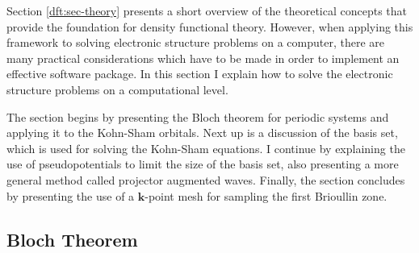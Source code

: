 \begin{refsection}
Section \ref{dft:sec-theory} presents a short overview of the theoretical 
concepts that provide the foundation for density functional theory. However, 
when applying this framework to solving electronic structure problems on a 
computer, there are many practical considerations which have to be made in 
order to implement an effective software package. In this section I explain 
how to solve the electronic structure problems on a computational 
level.  
 
The section begins by presenting the Bloch theorem for periodic systems and applying it 
to the Kohn-Sham orbitals. Next up is a discussion of the  
basis set, which is used for solving the Kohn-Sham equations.  I continue by 
explaining the use of pseudopotentials to limit the size of the basis set, 
also presenting a more general method called projector augmented waves. 
Finally, the section concludes by presenting the use of a $\mathbf{k}$-point mesh for 
sampling the first Brioullin zone. 
 
\subsection{Bloch Theorem}\label{dft:sec-bloch} 
 

\end{refsection}
